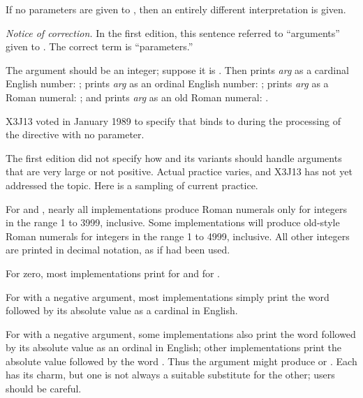 \begin{flushdesc}
If no parameters are given to , then an entirely different
interpretation is given.
\begin{new}%
\emph{Notice of correction.}
In the first edition, this sentence referred to ``arguments'' given to .
The correct term is ``parameters.''
\end{new}
The argument should be an integer;
suppose it is . Then
 prints \emph{arg} as a cardinal English number: ;
 prints \emph{arg} as an ordinal English number: ;
 prints \emph{arg} as a Roman numeral: ; and
 prints \emph{arg} as an old Roman numeral: .

\begin{new}
X3J13 voted in January 1989
to specify that  binds  to 
during the processing of the  directive with no parameter.
\end{new}

\begin{new}
The first edition did not specify how  and its variants should
handle arguments that are very large or not positive.  Actual practice varies,
and X3J13 has not yet addressed the topic.
Here is a sampling of current practice.

For  and , nearly all implementations
produce Roman numerals only for integers in the range 1 to 3999, inclusive.
Some implementations will produce old-style Roman numerals for integers in
the range 1 to 4999, inclusive.  All other integers are printed in decimal
notation, as if  had been used.

For zero, most implementations print  for 
and  for .

For  with a negative argument, most implementations simply print
the word  followed by its absolute value as a cardinal in English.

For  with a negative argument, some implementations also print
the word  followed by its absolute value as an ordinal in English;
other implementations print the absolute value followed by the word .
Thus the argument  might produce  or .
Each has its charm, but one is not always a suitable substitute for the other;
users should be careful.


\end{new}
\end{flushdesc}
